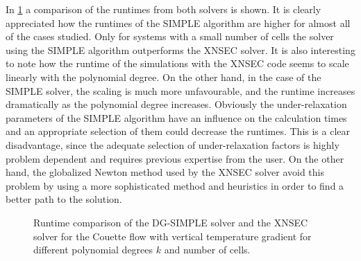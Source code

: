 In \cref{fig:RuntimeComparison} a comparison of the runtimes from both solvers is shown. It is clearly  appreciated how the runtimes of the SIMPLE algorithm are higher for almost all of the cases studied. Only for systems with a small number of cells the solver using the SIMPLE algorithm outperforms the XNSEC solver.  It is also interesting to note how the runtime of the simulations with the XNSEC code seems to scale linearly with the polynomial degree. On the other hand, in the case of the SIMPLE solver, the scaling is much more unfavourable, and the runtime increases dramatically as the polynomial degree increases.  Obviously the under-relaxation parameters of the SIMPLE algorithm have an influence on the calculation times and an appropriate selection of them could decrease the runtimes. This is a clear disadvantage, since the adequate selection of under-relaxation factors is highly problem dependent and requires previous expertise from the user. On the other hand, the globalized Newton method used by the XNSEC solver avoid this problem by using a more sophisticated method and heuristics in order to find a better path to the solution.
\begin{figure}	
\centering
	\caption{Runtime comparison of the DG-SIMPLE solver and the XNSEC solver for the Couette flow with vertical temperature gradient for different polynomial degrees $k$ and number of cells.}
	\label{fig:RuntimeComparison}
\end{figure}